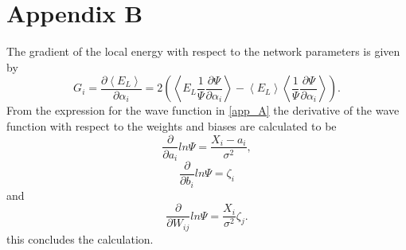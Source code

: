 \documentclass[11pt,a4paper,titlepage]{article}
\begin{document}
\section{Appendix B}\label{app_B}
The gradient of the local energy with respect to the network parameters is given by
\begin{equation}\label{eq:lE_gradient}
G_{i}=\frac{\partial\left\langle E_{L}\right\rangle}{\partial \alpha_{i}}=2\left(\left\langle E_{L} \frac{1}{\Psi} \frac{\partial \Psi}{\partial \alpha_{i}}\right\rangle-\left\langle E_{L}\right\rangle\left\langle\frac{1}{\Psi} \frac{\partial \Psi}{\partial \alpha_{i}}\right\rangle\right).
\end{equation}
From the expression for the wave function in \ref{app_A} the derivative of the wave function with respect to the weights and biases are calculated to be
$$
\frac{\partial}{\partial a_{i}} ln \Psi =\frac{X_{i}-a_{i}}{\sigma^{2}},
$$
$$
\frac{\partial}{\partial b_{i}} ln \Psi = \zeta_i
$$
and
$$
\frac{\partial}{\partial W_{i j}} ln \Psi =\frac{X_{i}}{\sigma^{2}}\zeta_j.
$$
this concludes the calculation.


\end{document}

